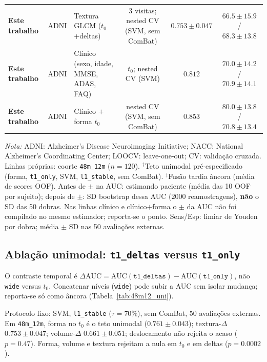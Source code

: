 \documentclass[review]{elsarticle}
\newcommand{\code}[1]{\texttt{#1}}
\begin{document}
\begin{table}
\begin{tabular}{@{}lllccc@{}}
		\textbf{Este trabalho} & ADNI &
		Textura GLCM ($t_0$+deltas) &
		3 visitas; nested CV (SVM, sem ComBat) &
		$\mathbf{0.753 \pm 0.047}$ & $\mathbf{66.5 \pm 15.9}$ / $\mathbf{68.3 \pm 13.8}$ \\
		\textbf{Este trabalho} & ADNI &
		Clínico (sexo, idade, MMSE, ADAS, FAQ) &
		$t_0$; nested CV (SVM) &
		$\mathbf{0.812}$ & $\mathbf{70.0 \pm 14.2}$ / $\mathbf{70.9 \pm 14.1}$ \\
		\textbf{Este trabalho} & ADNI &
		Clínico $+$ forma $t_0$ &
		nested CV (SVM, sem ComBat) &
		$\mathbf{0.853}$ & $\mathbf{80.0 \pm 13.8}$ / $\mathbf{70.8 \pm 13.4}$ \\
		\bottomrule
	\end{tabular}
	\vspace{0.5em}
	\begin{flushleft}
		\scriptsize
		\textit{Nota:}
		ADNI: Alzheimer's Disease Neuroimaging Initiative; NACC: National Alzheimer's Coordinating Center; LOOCV: leave-one-out; CV: validação cruzada.
		Linhas próprias: coorte \code{48m\_12m} ($n=120$).
		$^{\dagger}$Teto unimodal pré-especificado (forma, \code{t1\_only}, SVM, \code{l1\_stable}, sem ComBat).
		$^{\ddagger}$Fusão tardia âncora (média de scores OOF).
		Antes de $\pm$ na AUC: estimando paciente (média das 10 OOF por sujeito); depois de $\pm$: SD bootstrap dessa AUC ($2000$ reamostragens), \textbf{não} o SD das 50 dobras.
		Nas linhas clínico e clínico$+$forma o $\pm$ da AUC não foi compilado no mesmo estimador; reporta-se o ponto.
		Sens/Esp: limiar de Youden por dobra; média $\pm$ SD nas 50 avaliações externas.
	\end{flushleft}
\end{table}

\subsection{Ablação unimodal: \texorpdfstring{\code{t1\_deltas}}{t1\_deltas} versus \texorpdfstring{\code{t1\_only}}{t1\_only}}

O contraste temporal é $\Delta\mathrm{AUC}=\mathrm{AUC}(\code{t1\_deltas})-\mathrm{AUC}(\code{t1\_only})$, não \code{wide} versus $t_0$.
Concatenar níveis (\code{wide}) pode subir a AUC sem isolar mudança; reporta-se só como âncora (Tabela~\ref{tab:48m12_uni}).

Protocolo fixo: SVM, \code{l1\_stable} ($\tau=70\%$), sem ComBat, $50$ avaliações externas.
Em \code{48m\_12m}, forma no $t_0$ é o teto unimodal ($0.761\pm0.043$); textura-$\Delta$ $0.753\pm0.047$; volume-$\Delta$ $0.661\pm0.051$; deslocamento não rejeita o acaso ($p=0.47$).
Forma, volume e textura rejeitam a nula em $t_0$ e em deltas ($p=0.0002$).
\end{document}
